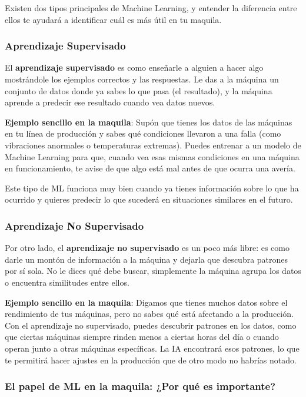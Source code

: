 Existen dos tipos principales de Machine Learning, y entender la diferencia entre ellos te ayudará a identificar cuál es más útil en tu maquila.

\subsubsection{\textbf{Aprendizaje Supervisado}}\label{aprendizaje-supervisado}

El \textbf{aprendizaje supervisado} es como enseñarle a alguien a hacer algo mostrándole los ejemplos correctos y las respuestas. Le das a la máquina un conjunto de datos donde ya sabes lo que pasa (el resultado), y la máquina aprende a predecir ese resultado cuando vea datos nuevos.

\textbf{Ejemplo sencillo en la maquila}: Supón que tienes los datos de las máquinas en tu línea de producción y sabes qué condiciones llevaron a una falla (como vibraciones anormales o temperaturas extremas). Puedes entrenar a un modelo de Machine Learning para que, cuando vea esas mismas condiciones en una máquina en funcionamiento, te avise de que algo está mal antes de que ocurra una avería.

Este tipo de ML funciona muy bien cuando ya tienes información sobre lo que ha ocurrido y quieres predecir lo que sucederá en situaciones similares en el futuro.

\subsubsection{\textbf{Aprendizaje No Supervisado}}\label{aprendizaje-no-supervisado}

Por otro lado, el \textbf{aprendizaje no supervisado} es un poco más libre: es como darle un montón de información a la máquina y dejarla que descubra patrones por sí sola. No le dices qué debe buscar, simplemente la máquina agrupa los datos o encuentra similitudes entre ellos.

\textbf{Ejemplo sencillo en la maquila}: Digamos que tienes muchos datos sobre el rendimiento de tus máquinas, pero no sabes qué está afectando a la producción. Con el aprendizaje no supervisado, puedes descubrir patrones en los datos, como que ciertas máquinas siempre rinden menos a ciertas horas del día o cuando operan junto a otras máquinas específicas. La IA encontrará esos patrones, lo que te permitirá hacer ajustes en la producción que de otro modo no habrías notado.

\subsubsection{\textbf{El papel de ML en la maquila: ¿Por qué es importante?}}\label{el-papel-de-ml-en-la-maquila-por-que-es-importante}

